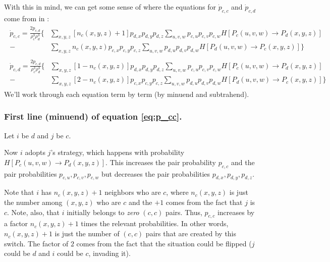 \documentclass[13pt]{amsart}
\begin{document}
With this in mind, we can get some sense of where the equations for $\dot{p}_{c,c}$ and $\dot{p}_{c,d}$ come from in \citet{li.etal_2019}:
\begin{align}
    \begin{split}
        \label{eq:p_cc}
        \dot{p}_{c,c} =
        \frac{2p_{c,d}}{\rho_c^3 \rho_d^3} \bigg\{ & \sum_{x,y,z} \left[n_c (x,y,z) + 1 \right] p_{d,x} p_{d,y} p_{d,z}
        \sum_{u,v,w} p_{c,u} p_{c,v} p_{c,w} H \left[ P_c (u,v,w) \to P_d (x,y,z) \right] \\
            - & \sum_{x,y,z} n_c(x,y,z) p_{c,x} p_{c,y} p_{c,z}
        \sum_{u,v,w} p_{d,u} p_{d,v} p_{d,w} H \left[ P_d (u,v,w) \to P_c (x,y,z) \right] \bigg\}
    \end{split}
    \\
    \begin{split}
        \label{eq:p_cd}
        \dot{p}_{c,d}  =
        \frac{2p_{c,d}}{\rho_c^3 \rho_d^3} \bigg\{ & \sum_{x,y,z} \left[1 - n_c (x,y,z)\right] p_{d,x} p_{d,y} p_{d,z}
        \sum_{u,v,w} p_{c,u} p_{c,v} p_{c,w} H \left[ P_c (u,v,w) \to P_d (x,y,z) \right] \\
            - & \sum_{x,y,z} \left[ 2 - n_c(x,y,z) \right] p_{c,x} p_{c,y} p_{c,z}
        \sum_{u,v,w} p_{d,u} p_{d,v} p_{d,w} H \left[ P_d (u,v,w) \to P_c (x,y,z) \right] \bigg\}
    \end{split}
\end{align}
We'll work through each equation term by term (by minuend and subtrahend).

\subsubsection*{First line (minuend) of equation \ref{eq:p_cc}.}

Let $i$ be $d$ and $j$ be $c$.

Now $i$ adopts $j$'s strategy, which happens with probability $H\left[P_c(u,v,w) \to P_d(x,y,z) \right]$.
This increases the pair probability $p_{c,c}$ and the pair probabilities $p_{c,u}, p_{c,v}, p_{c,w}$ but decreases the pair probabilities $p_{d,x}, p_{d,y}, p_{d,z}$.

Note that $i$ has $n_c(x, y, z) + 1$ neighbors who are $c$, where $n_c(x,y,z)$ is just the number among $(x, y, z)$ who are $c$ and the $+ 1$ comes from the fact that $j$ is $c$.
Note, also, that $i$ initially belongs to \emph{zero} $(c,c)$ pairs.
Thus, $p_{c,c}$ increases by a factor $n_c(x,y,z) + 1$ times the relevant probabilities.
In other words, $n_c(x,y,z) + 1 $ is just the number of $(c,c)$ pairs that are created by this switch.
The factor of $2$ comes from the fact that the situation could be flipped ($j$ could be $d$ and $i$ could be $c$, invading it).
\end{document}
